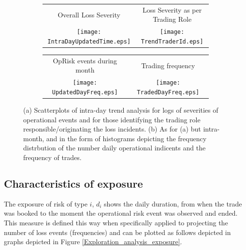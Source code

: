 \documentclass{DissertateUSU}
\begin{document}
\begin{figure}
\begin{subfigure}[b]{0.55\textwidth}
   \begin{frame}
      \centering
       \begin{tabular}{cc}
        Overall Loss Severity & Loss Severity as per Trading Role \\
        \texttt{[image: IntraDayUpdatedTime.eps]}
         &
         \texttt{[image: TrendTraderId.eps]}
         \end{tabular}
    \end{frame}
   \label{Intra_Day_Trends} 
\end{subfigure}

\begin{subfigure}[b]{0.55\textwidth}
   \begin{frame}
      \centering
       \begin{tabular}{cc}
        OpRisk events during month & Trading frequency \\
        \texttt{[image: UpdatedDayFreq.eps]}
         &
         \texttt{[image: TradedDayFreq.eps]}
         \end{tabular}
    \end{frame}
   \label{Hist_Loss_Freq}
\end{subfigure}
\caption[Numerical grid display]{(a) Scatterplots of intra-day trend analysis for logs of severities of operational events and for those identifying the trading role responsible/originating the loss incidents. (b) As for (a) but intra-month, and in the form of histograms depicting the frequency distrbution of the number daily operational indicents and the frequency of trades.} 
\end{figure}

\subsection{Characteristics of exposure}

The exposure of risk of type \(i\), \(d_i\) shows the daily duration,
from when the trade was booked to the moment the operational risk event
was observed and ended. This measure is defined this way when
specifically applied to projecting the number of loss events
(frequencies) and can be plotted as follows depicted in graphs depicted
in Figure \ref{Exploration_analysis_exposure}.\medskip
\end{document}
